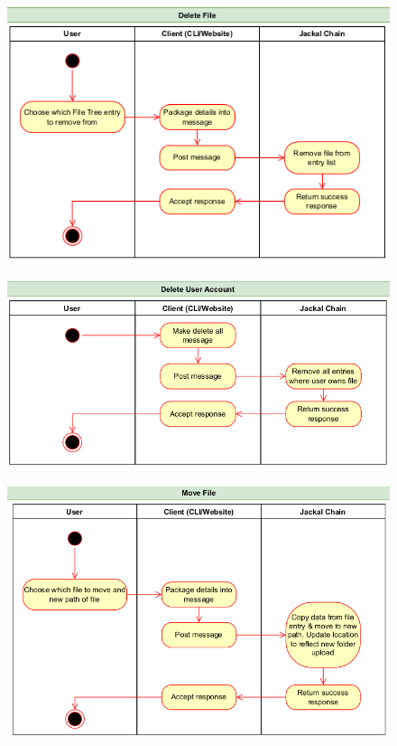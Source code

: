 \documentclass[a4paper]{article}
\begin{document}
\begin{figure}[!htbp]
\centering
\includegraphics[width=1\textwidth]{assets/filetree6.png}
\caption{}
\end{figure}

\begin{figure}[!htbp]
\centering
\includegraphics[width=1\textwidth]{assets/filetree7.png}
\caption{}
\end{figure}

\begin{figure}[!htbp]
\centering
\includegraphics[width=1\textwidth]{assets/filetree8.png}
\caption{}
\end{figure}
\end{document}
